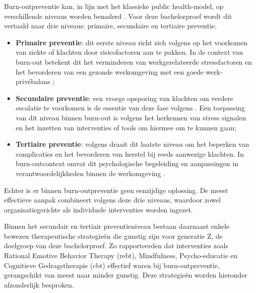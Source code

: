 \vspace{1em}

Burn-outpreventie kan, in lijn met het klassieke public health-model, op verschillende niveaus worden benaderd \autocite{AbdulRaheem2023}. Voor deze bachelorproef wordt dit vertaald naar drie niveaus: primaire, secundaire en tertiaire preventie.

\begin{itemize}
    \item \textbf{Primaire preventie}: dit eerste niveau richt zich volgens \textcite{AbdulRaheem2023} op het voorkomen van ziekte of klachten door risicofactoren aan te pakken. In de context van burn-out betekent dit het verminderen van werkgerelateerde stressfactoren en het bevorderen van een gezonde werkomgeving met een goede werk-privébalans \autocite{Leclercq2024};
    \item \textbf{Secundaire preventie}: een vroege opsporing van klachten om verdere escalatie te voorkomen is de essentie van deze fase volgens \textcite{AbdulRaheem2023}. Een toepassing van dit niveau binnen burn-out is volgens \textcite{Leclercq2024} het herkennen van stress signalen en het inzetten van interventies of tools om hiermee om te kunnen gaan;
    \item \textbf{Tertiaire preventie}: volgens \textcite{AbdulRaheem2023} draait dit laatste niveau om het beperken van complicaties en het bevorderen van herstel bij reeds aanwezige klachten. In burn-outcontext omvat dit psychologische begeleiding en aanpassingen in verantwoordelijkheden binnen de werkomgeving \autocite{Leclercq2024}.
\end{itemize}

Echter is er binnen burn-outpreventie geen eenzijdige oplossing. De meest effectieve aanpak combineert volgens \textcite{Leclercq2024} deze drie niveaus, waardoor zowel organisatiegerichte als individuele interventies worden ingezet.

\vspace{1em}

Binnen het secundair en tertiair preventieniveau bestaan daarnaast enkele bewezen therapeutische strategieën die gunstig zijn voor generatie Z, de doelgroep van deze bachelorproef. Zo rapporteerden \textcite{Madigan2023} dat interventies zoals Rational Emotive Behavior Therapy (\acrshort{rebt}), Mindfulness, Psycho-educatie en Cognitieve Gedragstherapie (\acrshort{cbt}) effectief waren bij burn-outpreventie, gerangschikt van meest naar minder gunstig. Deze strategieën worden hieronder afzonderlijk besproken.

